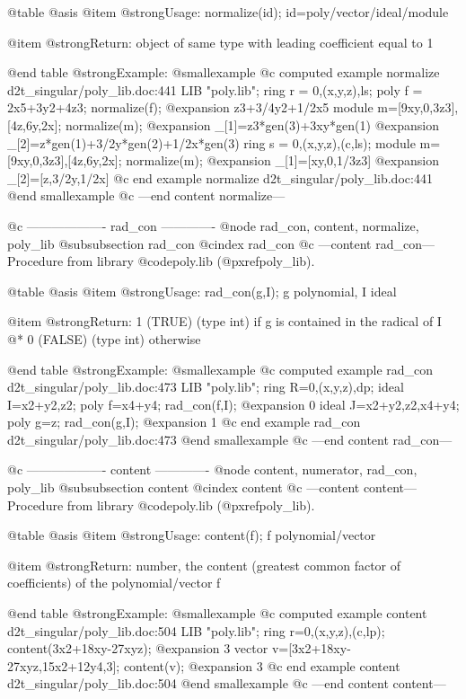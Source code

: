 @table @asis
@item @strong{Usage:}
normalize(id); id=poly/vector/ideal/module

@item @strong{Return:}
object of same type with leading coefficient equal to 1

@end table
@strong{Example:}
@smallexample
@c computed example normalize d2t_singular/poly_lib.doc:441 
LIB "poly.lib";
ring r = 0,(x,y,z),ls;
poly f = 2x5+3y2+4z3;
normalize(f);
@expansion{} z3+3/4y2+1/2x5
module m=[9xy,0,3z3],[4z,6y,2x];
normalize(m);
@expansion{} _[1]=z3*gen(3)+3xy*gen(1)
@expansion{} _[2]=z*gen(1)+3/2y*gen(2)+1/2x*gen(3)
ring s = 0,(x,y,z),(c,ls);
module m=[9xy,0,3z3],[4z,6y,2x];
normalize(m);
@expansion{} _[1]=[xy,0,1/3z3]
@expansion{} _[2]=[z,3/2y,1/2x]
@c end example normalize d2t_singular/poly_lib.doc:441
@end smallexample
@c ---end content normalize---

@c ------------------- rad_con -------------
@node rad_con, content, normalize, poly_lib
@subsubsection rad_con
@cindex rad_con
@c ---content rad_con---
Procedure from library @code{poly.lib} (@pxref{poly_lib}).

@table @asis
@item @strong{Usage:}
rad_con(g,I); g polynomial, I ideal

@item @strong{Return:}
1 (TRUE) (type int) if g is contained in the radical of I
@* 0 (FALSE) (type int) otherwise

@end table
@strong{Example:}
@smallexample
@c computed example rad_con d2t_singular/poly_lib.doc:473 
LIB "poly.lib";
ring R=0,(x,y,z),dp;
ideal I=x2+y2,z2;
poly f=x4+y4;
rad_con(f,I);
@expansion{} 0
ideal J=x2+y2,z2,x4+y4;
poly g=z;
rad_con(g,I);
@expansion{} 1
@c end example rad_con d2t_singular/poly_lib.doc:473
@end smallexample
@c ---end content rad_con---

@c ------------------- content -------------
@node content, numerator, rad_con, poly_lib
@subsubsection content
@cindex content
@c ---content content---
Procedure from library @code{poly.lib} (@pxref{poly_lib}).

@table @asis
@item @strong{Usage:}
content(f); f polynomial/vector

@item @strong{Return:}
number, the content (greatest common factor of coefficients)
of the polynomial/vector f

@end table
@strong{Example:}
@smallexample
@c computed example content d2t_singular/poly_lib.doc:504 
LIB "poly.lib";
ring r=0,(x,y,z),(c,lp);
content(3x2+18xy-27xyz);
@expansion{} 3
vector v=[3x2+18xy-27xyz,15x2+12y4,3];
content(v);
@expansion{} 3
@c end example content d2t_singular/poly_lib.doc:504
@end smallexample
@c ---end content content---

